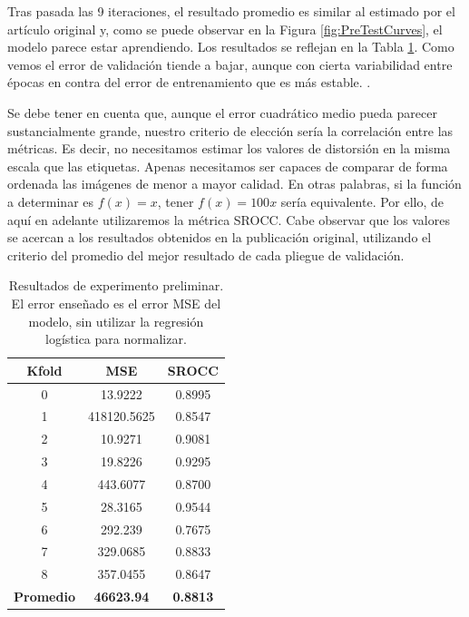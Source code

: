Tras pasada las 9 iteraciones, el resultado promedio es similar al estimado 
por el artículo original y, como se puede observar en la Figura \ref{fig:PreTestCurves},
el modelo parece estar aprendiendo. Los resultados se reflejan
en la Tabla \ref{tab:PreTestResults}. 
Como vemos el error de validación tiende a bajar, aunque con cierta variabilidad 
entre épocas en contra del error de entrenamiento que es más estable. . 

Se debe tener en cuenta que, aunque el error cuadrático medio pueda parecer 
sustancialmente grande, nuestro criterio de elección sería la correlación 
entre las métricas. Es decir, no necesitamos estimar los valores de distorsión 
en la misma escala que las etiquetas. Apenas necesitamos ser capaces de comparar 
de forma ordenada las imágenes de menor a mayor calidad. En otras palabras, 
si la función a determinar es $f(x) = x$, tener $f(x) = 100x$ sería equivalente.
Por ello, de aquí en adelante utilizaremos la métrica SROCC.
Cabe observar que los valores se acercan a los resultados obtenidos en la publicación original, 
utilizando el criterio del promedio del mejor resultado de cada pliegue de validación. 

\begin{table}[htp]
  \scriptsize
  \begin{center}
    \begin{tabular}[c]{|c|c|c|}
      \hline
      \rowcolor[HTML]{FFC702}
      \textbf{Kfold} & \textbf{MSE} & \textbf{SROCC} \\ 
      \hline 
      0 & 13.9222 & 0.8995 \\
      \hline 
      1 & 418120.5625 & 0.8547 \\ 
      \hline 
      2 & 10.9271 & 0.9081 \\
      \hline 
      3 & 19.8226 & 0.9295 \\ 
      \hline 
      4 & 443.6077 & 0.8700 \\ 
      \hline 
      5 & 28.3165 & 0.9544 \\ 
      \hline 
      6 & 292.239 & 0.7675 \\ 
      \hline 
      7 & 329.0685 & 0.8833 \\ 
      \hline 
      8 & 357.0455 & 0.8647 \\ 
      \hline
      \textbf{\cellcolor[HTML]{FFC702}Promedio} & \textbf{46623.94} & \textbf{0.8813} \\ 
      \hline
    \end{tabular}
  \end{center}
  \caption[Resultados de experimento preliminar.]{Resultados de experimento preliminar.
  El error enseñado es el error MSE del modelo, sin utilizar la regresión logística para normalizar.
  }
  \label{tab:PreTestResults}
\end{table}

